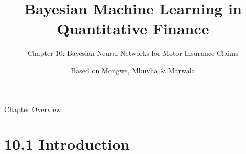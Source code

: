 \documentclass[aspectratio=169,10pt]{beamer}
\title[Bayesian ML in QF -- Ch.10]{Bayesian Machine Learning in Quantitative Finance}
\subtitle{Chapter 10: Bayesian Neural Networks for Motor Insurance Claims}
\author{Based on Mongwe, Mbuvha \& Marwala}
\institute{Springer, 2025}
\date{}
\begin{document}
\begin{frame}
  \titlepage
\end{frame}

\begin{frame}{Chapter Overview}
  \tableofcontents
\end{frame}


\section{10.1 Introduction}
\end{document}
